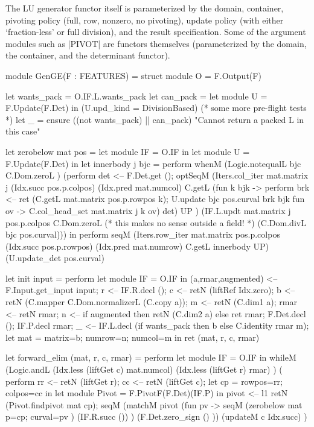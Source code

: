 \documentclass[draft]{elsart}
\begin{document}
The LU generator functor itself is 
parameterized by the domain, container, pivoting policy (full, row,
nonzero, no pivoting), update policy (with either `fraction-less'
or full division), and the result specification. Some of the
argument modules such as |PIVOT| are functors themselves (parameterized
by the domain, the container, and the determinant functor). 

\begin{code2}
module GenGE(F : FEATURES) = struct
    module O = F.Output(F)

    let wants_pack = O.IF.L.wants_pack
    let can_pack   = 
        let module U = F.Update(F.Det) in
        (U.upd_kind = DivisionBased)
    (* some more pre-flight tests *)
    let _ = ensure ((not wants_pack) || can_pack) 
           "Cannot return a packed L in this case"

    let zerobelow mat pos = 
        let module IF = O.IF in
        let module U = F.Update(F.Det) in
        let innerbody j bjc = perform
            whenM (Logic.notequalL bjc C.Dom.zeroL ) (perform
                det <-- F.Det.get ();
                optSeqM (Iters.col_iter mat.matrix j (Idx.succ pos.p.colpos) 
               (Idx.pred mat.numcol) C.getL
                      (fun k bjk -> perform
                      brk <-- ret (C.getL mat.matrix pos.p.rowpos k);
                      U.update bjc pos.curval brk bjk 
                          fun ov -> C.col_head_set mat.matrix j k ov) det) UP )
                      (IF.L.updt mat.matrix j pos.p.colpos C.Dom.zeroL 
                          (* this makes no sense outside a field! *)
                          (C.Dom.divL bjc pos.curval))) in
        perform
              seqM (Iters.row_iter mat.matrix pos.p.colpos
              (Idx.succ pos.p.rowpos)
              (Idx.pred mat.numrow) C.getL innerbody UP) 
                   (U.update_det pos.curval)

   let init input = perform
        let module IF = O.IF in
          (a,rmar,augmented) <-- F.Input.get_input input;
          r <-- IF.R.decl ();
          c <-- retN (liftRef Idx.zero);
          b <-- retN (C.mapper C.Dom.normalizerL (C.copy a));
          m <-- retN (C.dim1 a);
          rmar <-- retN rmar;
          n <-- if augmented then retN (C.dim2 a) else ret rmar;
          F.Det.decl ();
          IF.P.decl rmar;
          _ <-- IF.L.decl (if wants_pack then b else C.identity rmar m);
          let mat = {matrix=b; numrow=n; numcol=m} in
          ret (mat, r, c, rmar)

   let forward_elim (mat, r, c, rmar) = perform
        let module IF = O.IF in
          whileM (Logic.andL (Idx.less (liftGet c) mat.numcol)
                              (Idx.less (liftGet r) rmar) )
             ( perform
             rr <-- retN (liftGet r);
             cc <-- retN (liftGet c);
             let cp  = {rowpos=rr; colpos=cc} in
             let module Pivot = F.PivotF(F.Det)(IF.P) in
             pivot <-- l1 retN (Pivot.findpivot mat cp);
             seqM (matchM pivot (fun pv -> 
                      seqM (zerobelow mat {p=cp; curval=pv} )
                           (IF.R.succ ()) )
                      (F.Det.zero_sign () ))
                  (updateM c Idx.succ) )


\end{code2}
\end{document}
